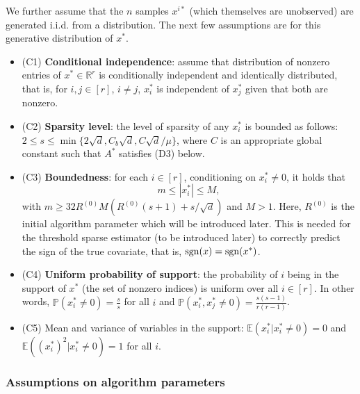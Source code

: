We further assume that the $n$ samples $x^{i*}$ (which themselves are unobserved) are generated i.i.d. from a distribution. The next few assumptions are for this
generative distribution of $x^*$.
\begin{itemize}
    \item (C1) \textbf{Conditional independence}: assume that distribution of nonzero entries of $x^*\in \mathbb{R}^{r}$ is conditionally independent and identically distributed, that is, for $i,j\in [r]$, $i\neq j$, $x_i^*$ is independent of $x_j^*$ given that both are nonzero. 
    \item (C2) \textbf{Sparsity level}: the level of sparsity of any $x_i^*$ is bounded as follows: $2\leq s \leq \min\{2 \sqrt{d}, C_b \sqrt{d}, C\sqrt{d}/\mu \}$, where $C$ is an appropriate global constant such that $A^*$ satisfies (D3) below. 
    \item (C3) \textbf{Boundedness}: for each $i\in [r]$, conditioning on $x^*_i\neq 0$, it holds that 
    \[ m \leq |x^*_i|\leq M, \]
    with $m\geq 32 R^{(0)} M(R^{(0)} (s+1) + s/\sqrt{d} )$ and $M>1$. Here, $R^{(0)}$ is the initial algorithm parameter which will be introduced later. This is needed for the threshold sparse estimator (to be introduced later) to correctly predict the sign of the true covariate, that is, ${\rm sgn}(x) = {\rm sgn}(x^*)$. 
    \item (C4) \textbf{Uniform probability of support}: the probability of $i$ being in the support of $x^*$ (the set of nonzero indices) is uniform over all $i\in [r]$. In other words, 
    $\mathbb{P}(x^*_i \neq 0) = \frac{s}{s}$ for all $i$ and $\mathbb{P}(x^*_i, x^*_j \neq 0) = \frac{s(s-1)}{r(r-1)}$. 
    \item (C5) Mean and variance of variables in the support: $\mathbb{E}(x_i^*|x_i^*\neq 0) = 0$ and $\mathbb{E}((x_i^*)^2|x_i^*\neq 0) = 1$ for all $i$. 
\end{itemize}

\subsubsection{Assumptions on algorithm parameters}

